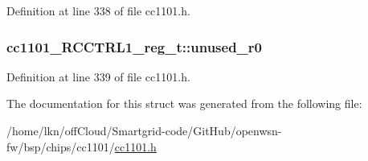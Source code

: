 Definition at line 338 of file cc1101.\+h.

\subsubsection[{\texorpdfstring{unused\+\_\+r0}{unused_r0}}]{ cc1101\+\_\+\+R\+C\+C\+T\+R\+L1\+\_\+reg\+\_\+t\+::unused\+\_\+r0}\hypertarget{structcc1101___r_c_c_t_r_l1__reg__t_a4af45b13f39313a252b4fdfe3fd77864}{}\label{structcc1101___r_c_c_t_r_l1__reg__t_a4af45b13f39313a252b4fdfe3fd77864}


Definition at line 339 of file cc1101.\+h.



The documentation for this struct was generated from the following file\+:\begin{DoxyCompactItemize}
\item 
/home/lkn/off\+Cloud/\+Smartgrid-\/code/\+Git\+Hub/openwsn-\/fw/bsp/chips/cc1101/\hyperlink{cc1101_8h}{cc1101.\+h}\end{DoxyCompactItemize}
